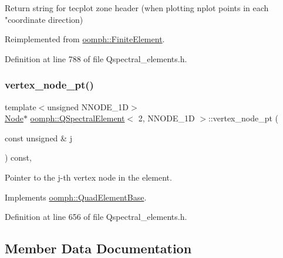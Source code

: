Return string for tecplot zone header (when plotting nplot points in each "coordinate direction) 



Reimplemented from \hyperlink{classoomph_1_1FiniteElement_a3193df31f9ce38e0609d17a8ffb386c6}{oomph\+::\+Finite\+Element}.



Definition at line 788 of file Qspectral\+\_\+elements.\+h.

\mbox{\label{classoomph_1_1QSpectralElement_3_012_00_01NNODE__1D_01_4_a7baa82a39e2593e5e3505c0ce1dd116b}} 
\subsubsection{\texorpdfstring{vertex\+\_\+node\+\_\+pt()}{vertex\_node\_pt()}}
{\footnotesize\ttfamily template$<$unsigned N\+N\+O\+D\+E\+\_\+1D$>$ \\
\hyperlink{classoomph_1_1Node}{Node}$\ast$ \hyperlink{classoomph_1_1QSpectralElement}{oomph\+::\+Q\+Spectral\+Element}$<$ 2, N\+N\+O\+D\+E\+\_\+1D $>$\+::vertex\+\_\+node\+\_\+pt (\begin{DoxyParamCaption}\item[{const unsigned \&}]{j }\end{DoxyParamCaption}) const\hspace{0.3cm}{\ttfamily [inline]}, {\ttfamily [virtual]}}



Pointer to the j-\/th vertex node in the element. 



Implements \hyperlink{classoomph_1_1QuadElementBase_a4873d97a8792ddbf951062c1d0069da7}{oomph\+::\+Quad\+Element\+Base}.



Definition at line 656 of file Qspectral\+\_\+elements.\+h.



\subsection{Member Data Documentation}
\mbox{\label{classoomph_1_1QSpectralElement_3_012_00_01NNODE__1D_01_4_af32777de68d22e844aeb5c0d93cbcda8}} 
